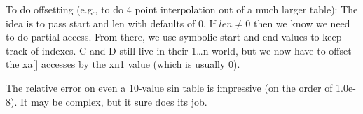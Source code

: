 To do offsetting (e.g., to do 4 point interpolation out of a much
larger table): The idea is to pass start and len with
defaults of 0.  If $len \ne 0$ then we know we need to do
partial access.  From there, we use symbolic start and end
values to keep track of indexes. C and D still live in their
1\dots n world, but we now have to offset the xa[] accesses by
the xn1 value (which is usually 0).

The relative error on even a 10-value sin table is
impressive (on the order of 1.0e-8).  It may be complex, but
it sure does its job.
